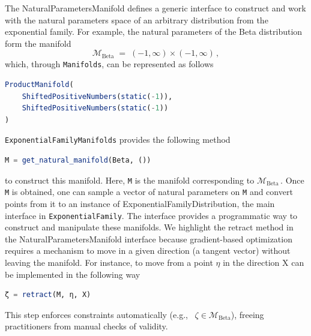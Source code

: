\documentclass{juliacon}
\newcommand{\bdv}[2][] {\todo[inline,backgroundcolor=blue!20!white, #1]{(bdv) #2}}
\newcommand{\dmitry}[2][] {\todo[inline,backgroundcolor=teal!20!white, #1]{(dmitry) #2}}
\newcommand{\code}[1]{\textsf{#1}}
\begin{document}
The \code{NaturalParametersManifold} defines a generic interface to construct and work with the natural parameters space of an arbitrary distribution from the exponential family. For example, the natural parameters of the Beta distribution form the manifold
\[
\mathcal{M}_{\mathrm{Beta}} \;=\; (-1,\infty) \times (-1,\infty)\,,
\]
which, through \texttt{Manifolds}, can be represented as follows 
\begin{lstlisting}[language=Julia]
ProductManifold(
    ShiftedPositiveNumbers(static(-1)),
    ShiftedPositiveNumbers(static(-1))
)
\end{lstlisting} \texttt{ExponentialFamilyManifolds} provides the following method \begin{lstlisting}[language=Julia]
M = get_natural_manifold(Beta, ())
\end{lstlisting} to construct this manifold. Here, \texttt{M} is the manifold corresponding  to 
\(\mathcal{M}_{\mathrm{Beta}}\,.\)
Once \texttt{M} is obtained, one can sample a vector of natural parameters on \texttt{M} 
and convert points from it to an instance of \code{ExponentialFamilyDistribution}, 
the main interface in \texttt{ExponentialFamily}. The interface provides a programmatic way to construct and manipulate these manifolds. We highlight the \code{retract} method in the \code{NaturalParametersManifold} interface 
because gradient-based optimization requires a mechanism to move in a given direction (a tangent vector) without leaving the manifold. 
For instance, to move from a point \(\eta\) in the direction \code{X} can be implemented in the following way
\begin{lstlisting}[language=Julia]
ζ = retract(M, η, X)
\end{lstlisting}
This step enforces constraints automatically (e.g., \ \(\zeta \in \mathcal{M}_{\mathrm{Beta}}\)),
freeing practitioners from manual checks of validity.
\end{document}

